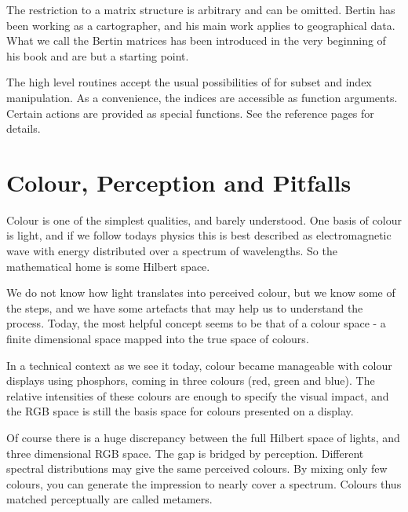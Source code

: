 \documentclass[nogin, dvips,12pt,a4paper,twoside]{amsart}
\begin{document}


The restriction to a matrix structure is arbitrary and can be omitted. Bertin has been working as a cartographer, and his main work applies to geographical data. What we call the Bertin matrices has been introduced in the very beginning of his book and are but a starting point. 

The high level routines accept the usual possibilities of \R{} for subset and index manipulation. As a convenience,  
the indices are accessible as function arguments. Certain actions are provided as special functions. See the reference pages for details.


\section{Colour, Perception and Pitfalls}

Colour is one of the simplest qualities, and barely understood. One basis of colour is light, and if we follow todays physics this is best described as electromagnetic wave with energy distributed over a spectrum of wavelengths. So the mathematical home is some Hilbert space.

We do not know how light translates into perceived colour, but we know some of the steps, and we have some artefacts that may help us to understand the process. Today, the most helpful concept seems to be that of a colour space - a finite dimensional space mapped into the true space of colours. 

In a technical context as we see it today, colour became manageable with colour displays using phosphors, coming in three colours (red, green and blue). The relative intensities of these colours are enough to specify the visual impact, and the RGB space is still the basis space for colours presented on a display.

Of course there is a huge discrepancy between the full Hilbert space of lights, and three dimensional RGB space.  The gap is bridged by perception. Different spectral distributions may give the same perceived colours. By mixing only few colours, you can generate the impression to nearly cover a spectrum. Colours thus matched perceptually are called metamers. 
\end{document}
